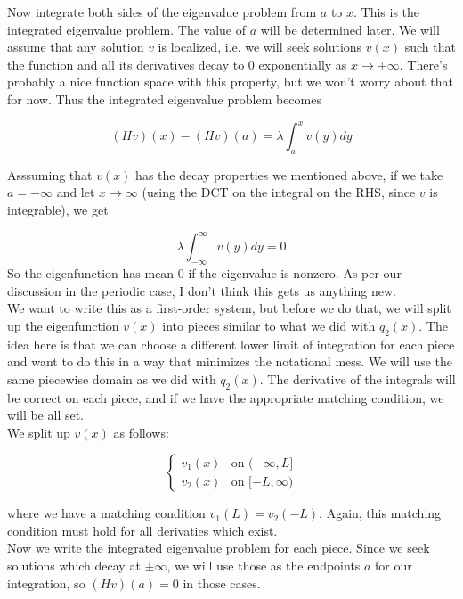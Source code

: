 \documentclass[12pt]{article}
\begin{document}
Now integrate both sides of the eigenvalue problem from $a$ to $x$. This is the integrated eigenvalue problem. The value of $a$ will be determined later. We will assume that any solution $v$ is localized, i.e. we will seek solutions $v(x)$ such that the function and all its derivatives decay to 0 exponentially as $x \rightarrow \pm \infty$. There's probably a nice function space with this property, but we won't worry about that for now. Thus the integrated eigenvalue problem becomes

\begin{equation}\label{inteigproblem}
(Hv)(x) - (Hv)(a) = \lambda \int_{a}^x v(y) dy
\end{equation}

Asssuming that $v(x)$ has the decay properties we mentioned above, if we take $a = -\infty$ and let $x \rightarrow \infty$ (using the DCT on the integral on the RHS, since $v$ is integrable), we get

\[
\lambda \int_{-\infty}^\infty v(y) dy = 0
\]
So the eigenfunction has mean 0 if the eigenvalue is nonzero. As per our discussion in the periodic case, I don't think this gets us anything new.\\

We want to write this as a first-order system, but before we do that, we will split up the eigenfunction $v(x)$ into pieces similar to what we did with $q_2(x)$. The idea here is that we can choose a different lower limit of integration for each piece and want to do this in a way that minimizes the notational mess. We will use the same piecewise domain as we did with $q_2(x)$. The derivative of the integrals will be correct on each piece, and if we have the appropriate matching condition, we will be all set. \\

We split up $v(x)$ as follows:

\begin{equation}
\begin{cases}
v_1(x) & \text{on } (-\infty, L]  \\
v_2(x) & \text{on } [-L, \infty)
\end{cases}
\end{equation}

where we have a matching condition $v_1(L) = v_2(-L)$. Again, this matching condition must hold for all derivaties which exist. \\

Now we write the integrated eigenvalue problem for each piece. Since we seek solutions which decay at $\pm \infty$, we will use those as the endpoints $a$ for our integration, so $(Hv)(a) = 0$ in those cases.
\end{document}
